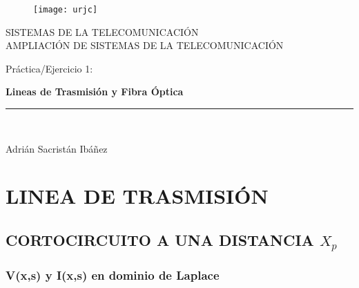 \documentclass[12pt]{article}
\begin{document}
\begin{titlepage}

\begin{center}
\vspace*{-1in}
\begin{figure}[htb]
\begin{center}
\texttt{[image: urjc]}
\end{center}
\end{figure}

SISTEMAS DE LA TELECOMUNICACIÓN\\
\vspace*{0.15in}
AMPLIACIÓN DE SISTEMAS DE LA TELECOMUNICACIÓN\\
\vspace*{0.6in}
\begin{large}
Práctica/Ejercicio 1:\\
\end{large}
\vspace*{0.2in}
\begin{Large}
\textbf{Lineas de Trasmisión y Fibra Óptica} \\
\end{Large}
\vspace*{0.3in}

\vspace*{0.3in}
\rule{80mm}{0.1mm}\\
\vspace*{0.1in}
\begin{large}
Adrián Sacristán Ibáñez \\
\end{large}
\end{center}

\end{titlepage}




\section{LINEA DE TRASMISIÓN}

\subsection{CORTOCIRCUITO A UNA DISTANCIA $X_{p}$}

\subsubsection{V(x,s) y I(x,s) en dominio de Laplace}
\end{document}
